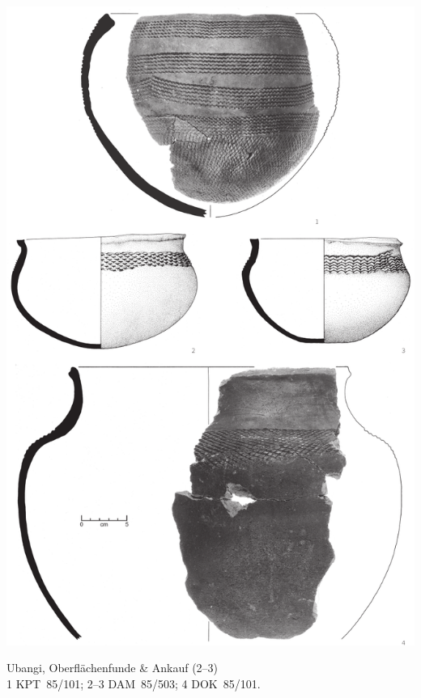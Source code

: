\begin{pl}[H]
	\includegraphics{plt/Taf22.pdf}
	\vspace{.75em}\caption{\mbox{Ubangi}, Oberflächenfunde \& Ankauf (2--3) \\ 1 KPT~85/101; 2--3 DAM~85/503; 4 DOK~85/101.}
	\label{pl:22}
\end{pl}

